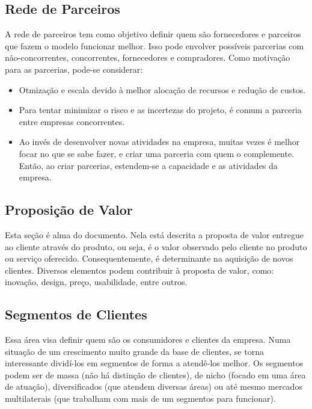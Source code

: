 \subsection{Rede de Parceiros}

A rede de parceiros tem como objetivo definir quem são fornecedores e parceiros que fazem o modelo funcionar melhor. Isso pode envolver possíveis parcerias com não-concorrentes, concorrentes, fornecedores e compradores. Como motivação para as parcerias, pode-se considerar:

\begin{itemize}
\item Otmização e escala devido à melhor alocação de recursos e redução de custos.
\item Para tentar minimizar o risco e as incertezas do projeto, é comum a parceria entre empresas concorrentes.
\item Ao invés de desenvolver novas atividades na empresa, muitas vezes é melhor focar no que se sabe fazer, e criar uma parceria com quem o complemente. Então, ao criar parcerias, estendem-se a capacidade e as atividades da empresa.
\end{itemize}

\subsection{Proposição de Valor}

Esta seção é alma do documento. Nela está descrita a proposta de valor entregue ao cliente através do produto, ou seja, é o valor observado pelo cliente no produto ou serviço oferecido. Consequentemente, é determinante na aquisição de novos clientes. Diversos elementos podem contribuir à proposta de valor, como: inovação, design, preço, usabilidade, entre outros.

\subsection{Segmentos de Clientes}

Essa área visa definir quem são os consumidores e clientes da empresa. Numa situação de um crescimento muito grande da base de clientes, se torna interessante dividí-los em segmentos de forma a atendê-los melhor. Os segmentos podem ser de massa (não há distinção de clientes), de nicho (focado em uma área de atuação), diversificados (que atendem diversas áreas) ou até mesmo mercados multilaterais (que trabalham com mais de um segmentos para funcionar).

